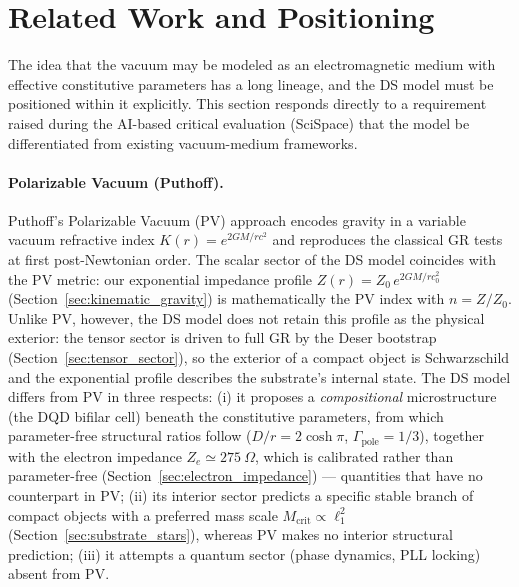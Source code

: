 \documentclass[11pt,a4paper]{article}
\theoremstyle{plain}
\theoremstyle{remark}
\begin{document}
\section{Related Work and Positioning}
\label{sec:related_work}

The idea that the vacuum may be modeled as an electromagnetic medium with effective constitutive parameters has a long lineage, and the DS model must be positioned within it explicitly. This section responds directly to a requirement raised during the AI-based critical evaluation (SciSpace) that the model be differentiated from existing vacuum-medium frameworks.

\paragraph{Polarizable Vacuum (Puthoff).} Puthoff's Polarizable Vacuum (PV) approach \cite{puthoff2002} encodes gravity in a variable vacuum refractive index $K(r) = e^{2GM/rc^2}$ and reproduces the classical GR tests at first post-Newtonian order. The scalar sector of the DS model coincides with the PV metric: our exponential impedance profile $Z(r) = Z_0\,e^{2GM/rc_0^2}$ (Section~\ref{sec:kinematic_gravity}) is mathematically the PV index with $n = Z/Z_0$. Unlike PV, however, the DS model does not retain this profile as the physical exterior: the tensor sector is driven to full GR by the Deser bootstrap (Section~\ref{sec:tensor_sector}), so the exterior of a compact object is Schwarzschild and the exponential profile describes the substrate's internal state. The DS model differs from PV in three respects: (i) it proposes a \emph{compositional} microstructure (the DQD bifilar cell) beneath the constitutive parameters, from which parameter-free structural ratios follow ($D/r = 2\cosh\pi$, $\Gamma_{\text{pole}} = 1/3$), together with the electron impedance $Z_e \simeq 275~\Omega$, which is calibrated rather than parameter-free (Section~\ref{sec:electron_impedance}) --- quantities that have no counterpart in PV; (ii) its interior sector predicts a specific stable branch of compact objects with a preferred mass scale $M_{\text{crit}} \propto \ell_1^2$ (Section~\ref{sec:substrate_stars}), whereas PV makes no interior structural prediction; (iii) it attempts a quantum sector (phase dynamics, PLL locking) absent from PV.
\end{document}
